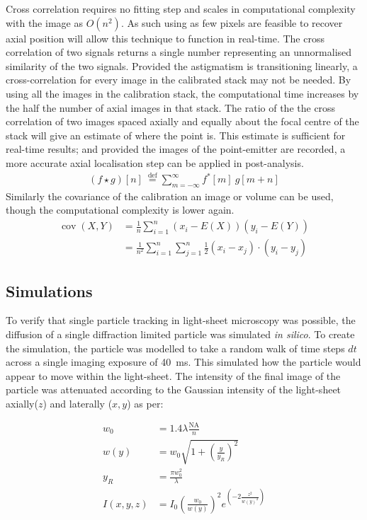 Cross correlation requires no fitting step and scales in computational complexity with the image as $O(n^2)$. %
As such using as few pixels are feasible to recover axial position will allow this technique to function in real-time.
The cross correlation of two signals returns a single number representing an unnormalised similarity of the two signals.
Provided the astigmatism is transitioning linearly, a cross-correlation for every image in the calibrated stack may not be needed.
By using all the images in the calibration stack, the computational time increases by the half the number of axial images in that stack.
The ratio of the the cross correlation of two images spaced axially and equally about the focal centre of the stack will give an estimate of where the point is.
This estimate is sufficient for real-time results; and provided the images of the point-emitter are recorded, a more accurate axial localisation step can be applied in post-analysis.
\begin{align}
(f \star g)[n]\ \stackrel{\mathrm{def}}{=} \sum_{m=-\infty}^{\infty} f^*[m]\ g[m+n]
\end{align}
Similarly the covariance of the calibration an image or volume can be used, though the computational complexity is lower again.
\begin{align}
  \operatorname{cov}(X,Y) &=\frac{1}{n}\sum_{i=1}^n (x_i-E(X))(y_i-E(Y)) \\
 &= \frac{1}{n^2} \sum_{i=1}^n \sum_{j=1}^n \frac{1}{2}(x_i - x_j)\cdot(y_i - y_j)
\end{align}

\subsection{Simulations}
To verify that single particle tracking in light-sheet microscopy was possible, the diffusion of a single diffraction limited particle was simulated \emph{in silico}.
To create the simulation, the particle was modelled to take a random walk of time steps $dt$ across a single imaging exposure of \SI{40}{\milli\second}.
This simulated how the particle would appear to move within the light-sheet.
The intensity of the final image of the particle was attenuated according to the Gaussian intensity of the light-sheet axially($z$) and laterally ($x,y$) as per:

\begin{align}
  w_0 &= 1.4 \lambda \frac{ \text{NA}}{n}\\
  w(y) &= w_0 \sqrt{1+\left(\frac{y}{y_R}\right)^2}\\
  y_R &= \frac{\pi w_0^2}{\lambda}\\
  I(x,y,z) &= I_0 \left(\frac{w_0}{w(y)}\right)^2 e^{\left(-2\frac{z^2}{w(y)^2}\right)}
\end{align}

